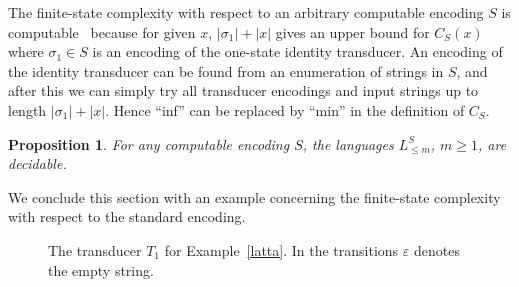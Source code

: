 \documentclass[copyright]{eptcs}
\newtheorem{proposition}[theorem]{Proposition}
\begin{document}
The finite-state complexity with respect
to an arbitrary computable encoding $S$ is computable~\cite{CSR}
because for given $x$, $|\sigma_1| + |x|$ gives an upper bound
for $C_S(x)$ where $\sigma_1 \in S$ is an encoding of
the one-state identity transducer.
An encoding of the identity transducer
can be found from an enumeration
of strings in $S$, and after this we can simply try all transducer
encodings and input strings up to length $|\sigma_1| + |x|$. Hence
``inf'' can be replaced by ``min'' in the definition of $C_{S}$.

\begin{proposition}
\label{prop61}
For any computable encoding
$S$, the languages $L^{S}_{ \leq m}$, $m \geq 1$, are decidable.
\end{proposition}

We conclude this section with an example concerning the finite-state
complexity with respect to the standard encoding. 

\begin{figure}[ht]
\hspace*{\fill}
\epsfxsize=15cm
\hspace*{\fill}
\caption{
\label{ratta}
The transducer $T_1$ for Example~\ref{latta}.
In the transitions $\varepsilon$ denotes the empty string.
}
\end{figure}
\fi
\end{document}
